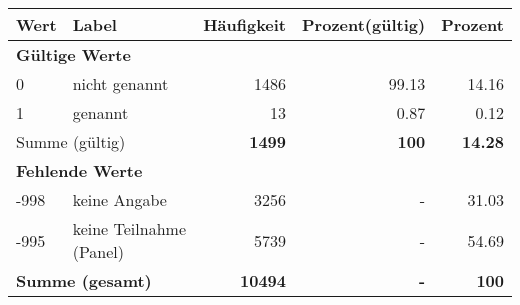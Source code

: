      \begin{longtable}{lXrrr}
     \toprule
     \textbf{Wert} & \textbf{Label} & \textbf{Häufigkeit} & \textbf{Prozent(gültig)} & \textbf{Prozent} \\
     \endhead
     \midrule
     \multicolumn{5}{l}{\textbf{Gültige Werte}}\\

     0 &
     \multicolumn{1}{X}{ nicht genannt   } &


       \num{1486} &
       \num[round-mode=places,round-precision=2]{99,13} &
         \num[round-mode=places,round-precision=2]{14,16} \\

     1 &
     \multicolumn{1}{X}{ genannt   } &


       \num{13} &
       \num[round-mode=places,round-precision=2]{0,87} &
         \num[round-mode=places,round-precision=2]{0,12} \\
     \midrule
     \multicolumn{2}{l}{Summe (gültig)} &
       \textbf{\num{1499}} &
     \textbf{100} &
       \textbf{\num[round-mode=places,round-precision=2]{14,28}} \\
     \multicolumn{5}{l}{\textbf{Fehlende Werte}}\\
       -998 &
       keine Angabe &
         \num{3256} &
        - &
         \num[round-mode=places,round-precision=2]{31,03} \\
       -995 &
       keine Teilnahme (Panel) &
         \num{5739} &
        - &
         \num[round-mode=places,round-precision=2]{54,69} \\
     \midrule
     \multicolumn{2}{l}{\textbf{Summe (gesamt)}} &
          \textbf{\num{10494}} &
        \textbf{-} &
        \textbf{100} \\
     \bottomrule
     \end{longtable}
     
